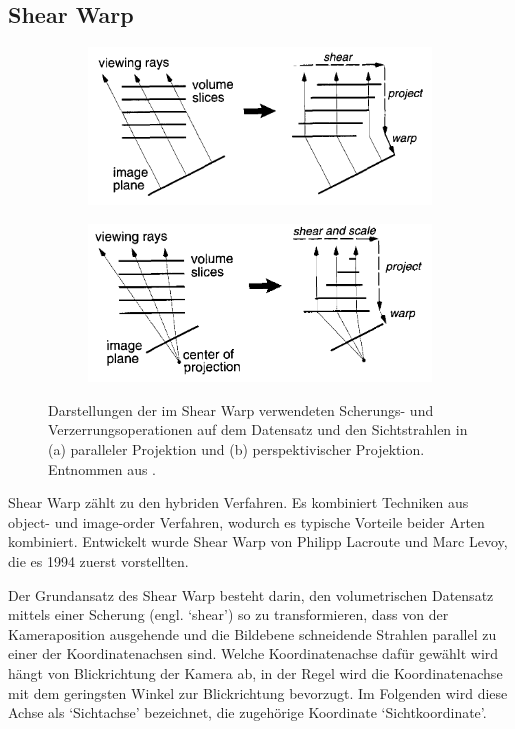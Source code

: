 \documentclass[a4paper,fontsize=12pt,toc=bib,halfparskip]{scrartcl}
\begin{document}
\subsection{Shear Warp}
\begin{figure}
	\centering
	\begin{subfigure}{0.49\textwidth}
		\includegraphics[width=\textwidth]{pictures/ShearWarp1}
		\caption{}
		\label{ShearWarp1}
	\end{subfigure}
	\hfill
	\begin{subfigure}{0.49\textwidth}
		\includegraphics[width=\textwidth]{pictures/ShearWarp2}
		\caption{}
		\label{ShearWarp2}
	\end{subfigure}
	\caption{Darstellungen der im Shear Warp verwendeten Scherungs- und Verzerrungsoperationen auf dem Datensatz und den Sichtstrahlen in (a) paralleler Projektion und (b) perspektivischer Projektion. Entnommen aus \cite{lacroute1994fast}.}
\end{figure}
Shear Warp z\"ahlt zu den hybriden Verfahren. Es kombiniert Techniken aus object- und image-order Verfahren, wodurch es typische Vorteile beider Arten kombiniert. Entwickelt wurde Shear Warp von Philipp Lacroute und Marc Levoy, die es 1994 zuerst vorstellten\cite{lacroute1994fast}. 

Der Grundansatz des Shear Warp besteht darin, den volumetrischen Datensatz mittels einer Scherung (engl. `shear') so zu transformieren, dass von der Kameraposition ausgehende und die Bildebene schneidende Strahlen parallel zu einer der Koordinatenachsen sind. Welche Koordinatenachse daf\"ur gew\"ahlt wird h\"angt von Blickrichtung der Kamera ab, in der Regel wird die Koordinatenachse mit dem geringsten Winkel zur Blickrichtung bevorzugt. Im Folgenden wird diese Achse als `Sichtachse' bezeichnet, die zugeh\"orige Koordinate `Sichtkoordinate'. 
\end{document}
